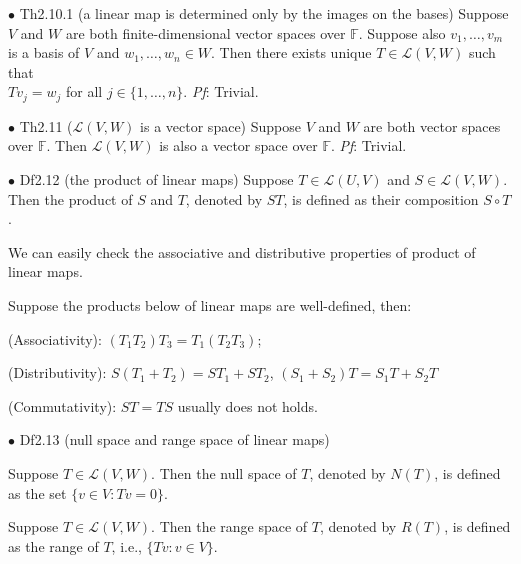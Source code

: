 \documentclass{article}
\begin{document}
\begin{Th}{$\bullet$ Th2.10.1 (a linear map is determined only by the images on the bases)}
    Suppose $V$ and $W$ are both finite-dimensional vector spaces over $\mathbb{F}$. Suppose also $v_1, \dots, v_m$ is a basis of $V$ and $w_1, \dots, w_n\in W$. Then there exists unique $T\in\mathcal{L}(V, W)$ such that\\
    $Tv_j = w_j$ for all $j\in\{1,\dots, n\}$.
    \tcblower
    \textit{Pf}: Trivial.
\end{Th}

\begin{Th}{$\bullet$ Th2.11 ($\mathcal{L}(V, W)$ is a vector space)}
    Suppose $V$ and $W$ are both vector spaces over $\mathbb{F}$. Then $\mathcal{L}(V, W)$ is also a vector space over $\mathbb{F}$.
    \tcblower
    \textit{Pf}: Trivial.
\end{Th}

\begin{Df}{$\bullet$ Df2.12 (the product of linear maps)}
    Suppose $T\in\mathcal{L}(U, V)$ and $S\in\mathcal{L}(V, W)$. Then the product of $S$ and $T$, denoted by $ST$, is defined as their composition $S\circ T$.
\end{Df}

\begin{Rmk}{}
    We can easily check the associative and distributive properties of product of linear maps.
    \textcolor{Th}{Suppose the products below of linear maps are well-defined, then:
    \begin{compactenum}
        \item (Associativity): $(T_1T_2)T_3 = T_1(T_2T_3)$;
        \item (Distributivity): $S(T_1+T_2) = ST_1+ST_2$, $(S_1+S_2)T = S_1T+S_2T$
        \item (Commutativity): $ST = TS$ usually does not holds.
    \end{compactenum}}
\end{Rmk}

\begin{Df}{$\bullet$ Df2.13 (null space and range space of linear maps)}
    \begin{compactenum}
        \item Suppose $T\in\mathcal{L}(V, W)$. Then the null space of $T$, denoted by $N(T)$, is defined as the set $\{v\in V: Tv = 0\}$.
        \item Suppose $T\in\mathcal{L}(V, W)$. Then the range space of $T$, denoted by $R(T)$, is defined as the range of $T$, i.e., $\{Tv: v\in V\}$.
    \end{compactenum}
\end{Df}
\end{document}
